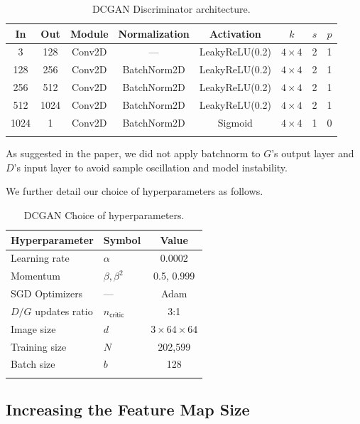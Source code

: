 \documentclass[table]{article}
\begin{document}
\begin{table}[ht]
\centering
\begin{tabular}{c c ccc c c c}
\Xhline{2\arrayrulewidth}
In & Out & Module & Normalization & Activation & $k$ & $s$ & $p$ \\
\hline
3 & 128 &Conv2D & --- & LeakyReLU(0.2) & $4 \times 4$ & 2 & 1 \\
128 & 256 &Conv2D & BatchNorm2D & LeakyReLU(0.2) & $4 \times 4$ & 2 & 1 \\
256 & 512 &Conv2D & BatchNorm2D & LeakyReLU(0.2) & $4 \times 4$ & 2 & 1 \\
512 & 1024 &Conv2D & BatchNorm2D & LeakyReLU(0.2) & $4 \times 4$ & 2 & 1 \\
1024 & 1 & Conv2D & BatchNorm2D & Sigmoid & $4 \times 4$ & 1 & 0 \\
\Xhline{2\arrayrulewidth}
\end{tabular}
\caption{DCGAN Discriminator architecture.}
\end{table}

As suggested in the paper, we did not apply batchnorm to $G$'s output layer and $D$'s input layer to avoid sample oscillation and model instability.

We further detail our choice of hyperparameters as follows.


\begin{table}[ht]
\centering
\begin{tabular}{l C{1.5cm} c}
\Xhline{2\arrayrulewidth}
Hyperparameter & Symbol & Value \\
\hline
Learning rate & $\alpha$ & 0.0002 \\
Momentum & $\beta, \beta^2$ & 0.5, 0.999\\
SGD Optimizers & --- & Adam \\
$D/G$ updates ratio & $n_{\textsf{critic}}$ & 3:1 \\
\hline
Image size & $d$ & $3 \times 64 \times 64$ \\
Training size & $N$ & 202,599\\
Batch size & $b$ & 128 \\
\Xhline{2\arrayrulewidth}
\end{tabular}
\caption{DCGAN Choice of hyperparameters.}
\end{table}

\subsection{Increasing the Feature Map Size}
\end{document}
